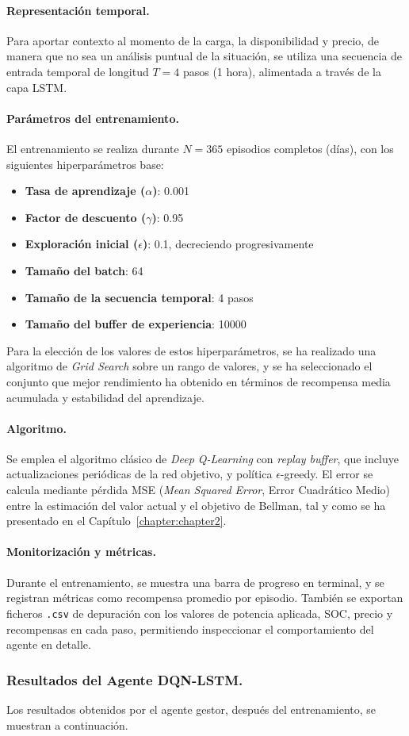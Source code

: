 \paragraph{Representación temporal.}  
Para aportar contexto al momento de la carga, la disponibilidad y precio, de manera que no sea un 
análisis puntual de la situación, se utiliza una secuencia de entrada temporal de longitud 
\(T = 4\) pasos (1 hora), alimentada a través de la capa LSTM.

\paragraph{Parámetros del entrenamiento.}  
El entrenamiento se realiza durante \(N = 365\) episodios completos (días), con los siguientes 
hiperparámetros base:
\begin{itemize}
    \item \textbf{Tasa de aprendizaje (\(\alpha\))}: 0.001
    \item \textbf{Factor de descuento (\(\gamma\))}: 0.95
    \item \textbf{Exploración inicial (\(\epsilon\))}: 0.1, decreciendo progresivamente
    \item \textbf{Tamaño del batch}: 64
    \item \textbf{Tamaño de la secuencia temporal}: 4 pasos
    \item \textbf{Tamaño del buffer de experiencia}: 10000
\end{itemize}

Para la elección de los valores de estos hiperparámetros, se ha realizado una algoritmo de 
\textit{Grid Search} sobre un rango de valores, y se ha seleccionado el conjunto que mejor 
rendimiento ha obtenido en términos de recompensa media acumulada y estabilidad del aprendizaje.

\paragraph{Algoritmo.}  
Se emplea el algoritmo clásico de \textit{Deep Q-Learning} con \textit{replay buffer}, que incluye
actualizaciones periódicas de la red objetivo, y política \(\epsilon\)-greedy. El error se calcula 
mediante pérdida MSE (\textit{Mean Squared Error}, Error Cuadrático Medio) entre la estimación del 
valor actual y el objetivo de Bellman, tal y como se ha presentado en el Capítulo~\ref{chapter:chapter2}.

\paragraph{Monitorización y métricas.}  
Durante el entrenamiento, se muestra una barra de progreso en terminal, y se registran métricas 
como recompensa promedio por episodio. También se exportan ficheros \texttt{.csv} de depuración con 
los valores de potencia aplicada, SOC, precio y recompensas en cada paso, permitiendo inspeccionar 
el comportamiento del agente en detalle.

\subsubsection{Resultados del Agente DQN-LSTM.}
Los resultados obtenidos por el agente gestor, después del entrenamiento, se muestran a continuación.
